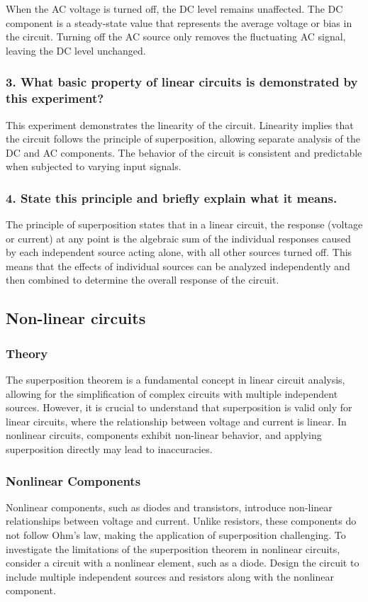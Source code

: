 When the AC voltage is turned off, the DC level remains unaffected. The DC component is a steady-state value that represents the average voltage or bias in the circuit. Turning off the AC source only removes the fluctuating AC signal, leaving the DC level unchanged.

\subsubsection{3. What basic property of linear circuits is demonstrated by this experiment?}

This experiment demonstrates the linearity of the circuit. Linearity implies that the circuit follows the principle of superposition, allowing separate analysis of the DC and AC components. The behavior of the circuit is consistent and predictable when subjected to varying input signals.

\subsubsection{4. State this principle and briefly explain what it means.}

The principle of superposition states that in a linear circuit, the response (voltage or current) at any point is the algebraic sum of the individual responses caused by each independent source acting alone, with all other sources turned off. This means that the effects of individual sources can be analyzed independently and then combined to determine the overall response of the circuit.


\subsection{Non-linear circuits}

\subsubsection{Theory}
The superposition theorem is a fundamental concept in linear circuit analysis, allowing for the simplification of complex circuits with multiple independent sources. However, it is crucial to understand that superposition is valid only for linear circuits, where the relationship between voltage and current is linear. In nonlinear circuits, components exhibit non-linear behavior, and applying superposition directly may lead to inaccuracies.
\subsubsection{Nonlinear Components}
Nonlinear components, such as diodes and transistors, introduce non-linear relationships between voltage and current. Unlike resistors, these components do not follow Ohm's law, making the application of superposition challenging.
To investigate the limitations of the superposition theorem in nonlinear circuits, consider a circuit with a nonlinear element, such as a diode. Design the circuit to include multiple independent sources and resistors along with the nonlinear component.

